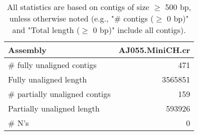 \documentclass[12pt,a4paper]{article}
\begin{document}
\begin{table}[ht]
\begin{center}
\caption{All statistics are based on contigs of size $\geq$ 500 bp, unless otherwise noted (e.g., "\# contigs ($\geq$ 0 bp)" and "Total length ($\geq$ 0 bp)" include all contigs).}
\begin{tabular}{|l*{1}{|r}|}
\hline
Assembly & AJ055.MiniCH.cr \\ \hline
\# fully unaligned contigs & 471 \\ \hline
Fully unaligned length & 3565851 \\ \hline
\# partially unaligned contigs & 159 \\ \hline
Partially unaligned length & 593926 \\ \hline
\# N's & 0 \\ \hline
\end{tabular}
\end{center}
\end{table}
\end{document}
